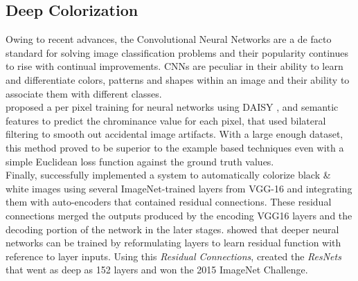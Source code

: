 \documentclass[12pt, letterpaper]{article}
\begin{document}
		\subsection{Deep Colorization}
		\hspace*{0.25 in}Owing to recent advances, the Convolutional Neural Networks are a de facto standard for solving image classification problems and their popularity continues to rise with continual improvements. CNNs are peculiar in their ability to learn and differentiate colors, patterns and shapes within an image and their ability to associate them with different classes.\\
		\hspace*{0.25 in}\cite{cheng2016deep} proposed a per pixel training for neural networks using DAISY \citep{tola2008descriptor}, and semantic \citep{long2015semantic} features to predict the chrominance value for each pixel, that used bilateral filtering to smooth out accidental image artifacts. With a large enough dataset, this method proved to be superior to the example based techniques even with a simple Euclidean loss function against the ground truth values.\\
		\hspace*{0.25 in}Finally, \cite{dahl2016automatic} successfully implemented a system to automatically colorize black \& white images using several ImageNet-trained layers from VGG-16 \cite{simonyan2015deep} and integrating them with auto-encoders that contained residual connections. These residual connections merged the outputs produced by the encoding VGG16 layers and the decoding portion of the network in the later stages. \cite{he2015deep} showed that deeper neural networks can be trained by reformulating layers to learn residual function with reference to layer inputs. Using this \textit{Residual Connections}, \cite{he2015deep} created the \textit{ResNets} that went as deep as 152 layers and won the 2015 ImageNet Challenge.
\end{document}

